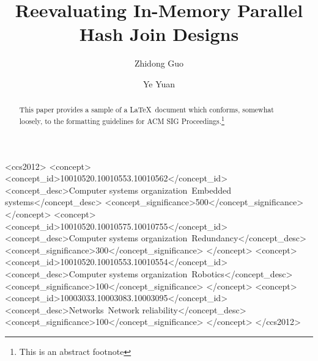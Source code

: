 \documentclass[10pt,sigconf,camera-ready]{acmart}
\begin{document}
\title{Reevaluating In-Memory Parallel Hash Join Designs}

\author{Zhidong Guo}

\author{Ye Yuan}


\renewcommand{\shortauthors}{Z. Guo et al.}


\begin{abstract}
This paper provides a sample of a \LaTeX\ document which conforms,
somewhat loosely, to the formatting guidelines for
ACM SIG Proceedings.\footnote{This is an abstract footnote}
\end{abstract}

%
%
\begin{CCSXML}
<ccs2012>
 <concept>
  <concept_id>10010520.10010553.10010562</concept_id>
  <concept_desc>Computer systems organization~Embedded systems</concept_desc>
  <concept_significance>500</concept_significance>
 </concept>
 <concept>
  <concept_id>10010520.10010575.10010755</concept_id>
  <concept_desc>Computer systems organization~Redundancy</concept_desc>
  <concept_significance>300</concept_significance>
 </concept>
 <concept>
  <concept_id>10010520.10010553.10010554</concept_id>
  <concept_desc>Computer systems organization~Robotics</concept_desc>
  <concept_significance>100</concept_significance>
 </concept>
 <concept>
  <concept_id>10003033.10003083.10003095</concept_id>
  <concept_desc>Networks~Network reliability</concept_desc>
  <concept_significance>100</concept_significance>
 </concept>
</ccs2012>  
\end{CCSXML}

\end{document}

